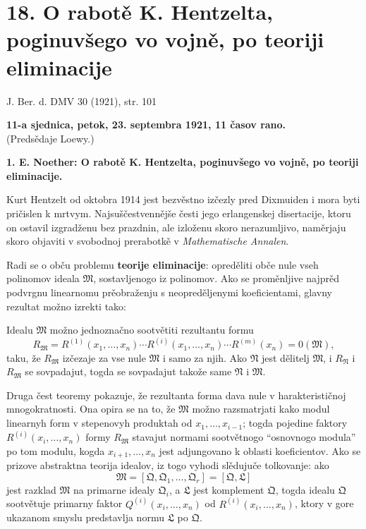 \documentclass[11pt]{article}
\begin{document}

\setcounter{footnote}{0}
\section*{18. O rabotě K. Hentzelta, poginuvšego vo vojně, po teoriji eliminacije}
\begin{center}
J. Ber. d. DMV 30 (1921), str. 101
\end{center}

\begin{center}
\textbf{11-a sjednica, petok, 23. septembra 1921, 11 časov rano.}\\
(Predsědaje Loewy.)
\end{center}

\textbf{1. E. Noether: O rabotě K. Hentzelta, poginuvšego vo vojně, po teoriji eliminacije.}

Kurt Hentzelt od oktobra 1914 jest bezvěstno izčezly pred Dixmuiden i mora byti pričislen k mrtvym. Najsuščestvennějše česti jego erlangenskej disertacije, ktoru on ostavil izgradženu bez prazdnin, ale izloženu skoro nerazumljivo, naměrjaju skoro objaviti v svobodnoj prerabotkě v \emph{Mathematische Annalen}.

Radi se o obču problemu \textbf{teorije eliminacije}: opreděliti obče nule vseh polinomov ideala \(\mathfrak M\), sostavljenogo iz polinomov. Ako se proměnljive najprěd podvrgnu linearnomu prěobraženju s neopreděljenymi koeficientami, glavny rezultat možno izrekti tako:

Idealu \(\mathfrak M\) možno jednoznačno sootvětiti rezultantu formu
\[
 R_{\mathfrak M}=R^{(1)}(x_1,
\ldots,x_n)\cdots R^{(i)}(x_1,
\ldots,x_n)\cdots R^{(m)}(x_n)=0(\mathfrak M),
\]
taku, že \(R_{\mathfrak M}\) izčezaje za vse nule \(\mathfrak M\) i samo za njih. Ako \(\mathfrak N\) jest dělitelj \(\mathfrak M\), i \(R_{\mathfrak N}\) i \(R_{\mathfrak M}\) se sovpadajut, togda se sovpadajut takože same \(\mathfrak N\) i \(\mathfrak M\).

Druga čest teoremy pokazuje, že rezultanta forma dava nule v harakterističnoj mnogokratnosti. Ona opira se na to, že \(\mathfrak M\) možno razsmatrjati kako modul linearnyh form v stepenovyh produktah od \(x_1,
\ldots,x_{i-1}\); togda pojedine faktory \(R^{(i)}(x_i,
\ldots,x_n)\) formy \(R_{\mathfrak M}\) stavajut normami sootvětnogo ``osnovnogo modula'' po tom modulu, kogda \(x_{i+1},
\ldots,x_n\) jest adjungovano k oblasti koeficientov. Ako se prizove abstraktna teorija idealov, iz togo vyhodi slědujuče tolkovanje: ako
\[
 \mathfrak M=[\mathfrak Q,\mathfrak Q_1,
\ldots,
\mathfrak Q_r]=[\mathfrak Q,\mathfrak L]
\]
jest razklad \(\mathfrak M\) na primarne idealy \(\mathfrak Q_i\), a \(\mathfrak L\) jest komplement \(\mathfrak Q\), togda idealu \(\mathfrak Q\) sootvětuje primarny faktor \(Q^{(i)}(x_i,
\ldots,x_n)\) od \(R^{(i)}(x_i,
\ldots,x_n)\), ktory v gore ukazanom smyslu predstavlja normu \(\mathfrak L\) po \(\mathfrak Q\).

\clearpage
\end{document}
